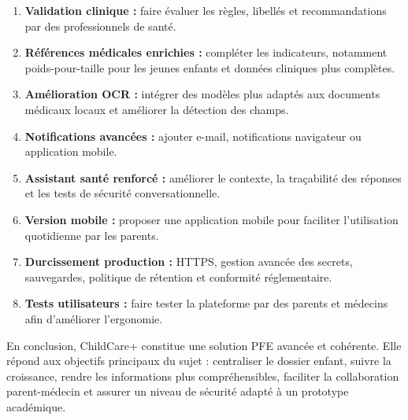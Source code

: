 \begin{enumerate}
    \item \textbf{Validation clinique :} faire évaluer les règles, libellés et recommandations par des professionnels de santé.
    \item \textbf{Références médicales enrichies :} compléter les indicateurs, notamment poids-pour-taille pour les jeunes enfants et données cliniques plus complètes.
    \item \textbf{Amélioration OCR :} intégrer des modèles plus adaptés aux documents médicaux locaux et améliorer la détection des champs.
    \item \textbf{Notifications avancées :} ajouter e-mail, notifications navigateur ou application mobile.
    \item \textbf{Assistant santé renforcé :} améliorer le contexte, la traçabilité des réponses et les tests de sécurité conversationnelle.
    \item \textbf{Version mobile :} proposer une application mobile pour faciliter l'utilisation quotidienne par les parents.
    \item \textbf{Durcissement production :} HTTPS, gestion avancée des secrets, sauvegardes, politique de rétention et conformité réglementaire.
    \item \textbf{Tests utilisateurs :} faire tester la plateforme par des parents et médecins afin d'améliorer l'ergonomie.
\end{enumerate}

En conclusion, ChildCare+ constitue une solution PFE avancée et cohérente. Elle répond aux objectifs principaux du sujet : centraliser le dossier enfant, suivre la croissance, rendre les informations plus compréhensibles, faciliter la collaboration parent-médecin et assurer un niveau de sécurité adapté à un prototype académique.

